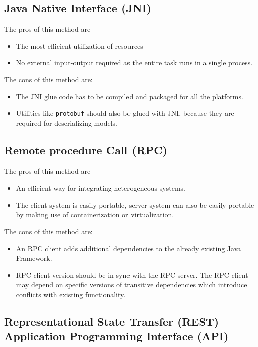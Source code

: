 \documentclass[letterpaper, 10 pt, conference]{ieeeconf}  %
\begin{document}
\subsection{Java Native Interface (JNI)} \label{sec:eval-jni}

The pros of this method are 
\begin{itemize}
\item The most efficient utilization of resources
\item No external input-output required as the entire task runs in a single process.
\end{itemize}

The cons of this method are:
\begin{itemize}
  \item The JNI glue code has to be compiled and packaged for all the platforms.
  \item Utilities like \texttt{protobuf} should also be glued with JNI, because they are required for deserializing models\cite{javacpp-240}. 
\end{itemize}

\subsection{Remote procedure Call (RPC)} \label{sec:eval-rpc}

The pros of this method are 
\begin{itemize}
\item An efficient way for integrating heterogeneous systems.
\item The client system is easily portable, server system can also be easily portable by making use of containerization or virtualization.
\end{itemize}

The cons of this method are:
\begin{itemize}
  \item An RPC client adds additional dependencies to the already existing Java Framework.
  \item RPC client version should be in sync with the RPC server. The RPC client may depend on specific versions of transitive dependencies which introduce conflicts with existing functionality.
\end{itemize}

\subsection{Representational State Transfer (REST) Application Programming Interface (API)} \label{sec:eval-rest}
\end{document}
